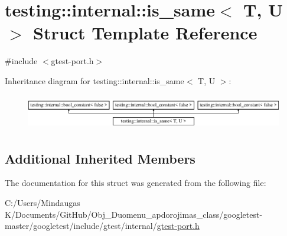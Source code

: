 \hypertarget{structtesting_1_1internal_1_1is__same}{}\section{testing\+::internal\+::is\+\_\+same$<$ T, U $>$ Struct Template Reference}
\label{structtesting_1_1internal_1_1is__same}


{\ttfamily \#include $<$gtest-\/port.\+h$>$}

Inheritance diagram for testing\+::internal\+::is\+\_\+same$<$ T, U $>$\+:\begin{figure}[H]
\begin{center}
\leavevmode
\includegraphics[height=1.562064cm]{da/dc3/structtesting_1_1internal_1_1is__same}
\end{center}
\end{figure}
\subsection*{Additional Inherited Members}


The documentation for this struct was generated from the following file\+:\begin{DoxyCompactItemize}
\item 
C\+:/\+Users/\+Mindaugas K/\+Documents/\+Git\+Hub/\+Obj\+\_\+\+Duomenu\+\_\+apdorojimas\+\_\+class/googletest-\/master/googletest/include/gtest/internal/\mbox{\hyperlink{googletest-master_2googletest_2include_2gtest_2internal_2gtest-port_8h}{gtest-\/port.\+h}}\end{DoxyCompactItemize}

